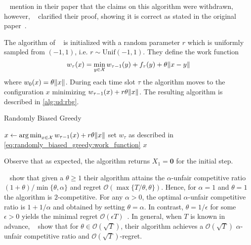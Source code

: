 \citeauthor{Bansal2015}~\cite{Bansal2015} mention in their paper that the claims on this algorithm were withdrawn, however, \citeauthor{Andrew2015}~\cite{Andrew2015} clarified their proof, showing it is correct as stated in the original paper~\cite{Wierman}.

The algorithm of \citeauthor{Andrew2015}~\cite{Andrew2015} is initialized with a random parameter $r$ which is uniformly sampled from $({-1,1})$, i.e. $r \sim \text{Unif}(-1, 1)$. They define the work function \begin{align}\label{eq:randomly_biased_greedy:work_function}
    w_{\tau}(x) = \min_{y \in \mathcal{X}} w_{\tau-1}(y) + f_{\tau}(y) + \theta \lVert x - y\rVert
\end{align} where $w_0(x) = \theta \lVert x\rVert$. During each time slot $\tau$ the algorithm moves to the configuration $x$ minimizing $w_{\tau-1}(x) + r \theta \lVert x\rVert$. The resulting algorithm is described in \cref{alg:ud:rbg}.

\begin{algorithm}
    \caption{Randomly Biased Greedy~\cite{Andrew2015}}\label{alg:ud:rbg}
    $x \gets \operatorname*{arg\,min}_{x \in \mathcal{X}} w_{\tau-1}(x) + r \theta \lVert x\rVert$\;
    set $w_{\tau}$ as described in \cref{eq:randomly_biased_greedy:work_function}\;
    \Return $x$\;
\end{algorithm}

Observe that as expected, the algorithm returns $X_1 = \mathbf{0}$ for the initial step.

\citeauthor{Andrew2015}~\cite{Andrew2015} show that given a $\theta \geq 1$ their algorithm attains the $\alpha$-unfair competitive ratio $(1+\theta) / \min \{\theta, \alpha\}$ and regret $\mathcal{O}(\max \{T / \theta, \theta\})$. Hence, for $\alpha = 1$ and $\theta = 1$ the algorithm is $2$-competitive. For any $\alpha > 0$, the optimal $\alpha$-unfair competitive ratio is $1 + 1 / \alpha$ and obtained by setting $\theta = \alpha$. In contrast, $\theta = 1 / \epsilon$ for some $\epsilon > 0$ yields the minimal regret $\mathcal{O}(\epsilon T)$~\cite{Andrew2015}. In general, when $T$ is known in advance, \citeauthor{Andrew2015}~\cite{Andrew2015} show that for $\theta \in \mathcal{O}(\sqrt{T})$, their algorithm achieves a $\mathcal{O}(\sqrt{T})$ $\alpha$-unfair competitive ratio and $\mathcal{O}(\sqrt{T})$-regret.

